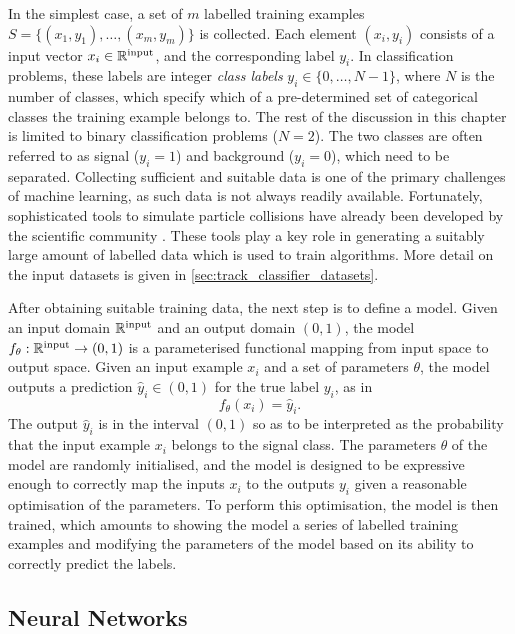 In the simplest case, a set of $m$ labelled training examples $S = \{ (x_1, y_1) , \ldots , (x_m, y_m) \}$ is collected.
Each element $(x_i, y_i)$ consists of a input vector $x_i  \in \mathbb{R}^{\textnormal{input}}$, and the corresponding label $y_i$.
In classification problems, these labels are integer \textit{class labels} $y_i \in \{0,\ldots,N-1\}$, where $N$ is the number of classes, which specify which of a pre-determined set of categorical classes the training example belongs to.
The rest of the discussion in this chapter is limited to binary classification problems ($N = 2$).
The two classes are often referred to as signal ($y_i = 1$) and background ($y_i = 0$), which need to be separated.
Collecting sufficient and suitable data is one of the primary challenges of machine learning, as such data is not always readily available.
Fortunately, sophisticated tools to simulate particle collisions have already been developed by the scientific community \cite{Boos:2001cv,leshouchesstandardisation}.
These tools play a key role in generating a suitably large amount of labelled data which is used to train algorithms.
More detail on the input datasets is given in \cref{sec:track_classifier_datasets}.

After obtaining suitable training data, the next step is to define a model.
Given an input domain $\mathbb{R}^{\textnormal{input}}$ and an output domain $(0, 1)$, the model
$f_\theta: \mathbb{R}^{\textnormal{input}} \to (0, 1)$ is a parameterised functional mapping from input space to output space.
Given an input example $x_i$ and a set of parameters $\theta$, the model outputs a prediction $\hat{y}_i \in (0, 1)$ for the true label $y_i$, as in
%
\begin{equation}
    f_\theta(x_i) = \hat{y}_i .
\end{equation}
%
The output $\hat{y}_i$ is in the interval $(0, 1)$ so as to be interpreted as the probability that the input example $x_i$ belongs to the signal class.
The parameters $\theta$ of the model are randomly initialised, and the model is designed to be expressive enough to correctly map the inputs $x_i$ to the outputs $y_i$ given a reasonable optimisation of the parameters.
To perform this optimisation, the model is then trained, which amounts to showing the model a series of labelled training examples and modifying the parameters of the model based on its ability to correctly predict the labels.


\subsection{Neural Networks}\label{sec:neural_nets}

